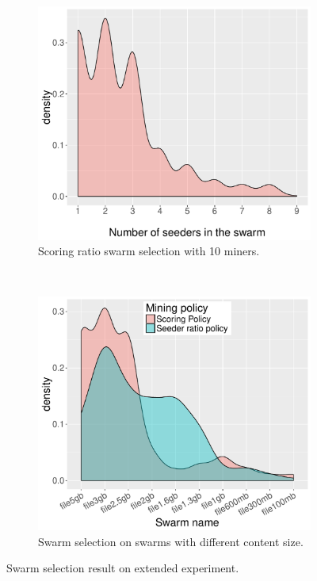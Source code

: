 \begin{figure}[b!]
	\begin{adjustwidth}{-1.5cm}{}
		\begin{subfigure}[t]{0.6\textwidth}
			\centering
			\includegraphics[width=\textwidth]{pics/results/sc10_density.pdf}
			\caption{Scoring ratio swarm selection with 10 miners.}
			\label{fig:scattersc10}
		\end{subfigure}
		~
		\begin{subfigure}[t]{0.6\textwidth}
			\centering
			\includegraphics[width=\textwidth]{pics/results/scmulti_density.pdf}
			\caption{Swarm selection on swarms with different content size.}
			\label{fig:scatterscmulti}
		\end{subfigure}
		\caption{Swarm selection result on extended experiment.}
	\end{adjustwidth}
\end{figure}

